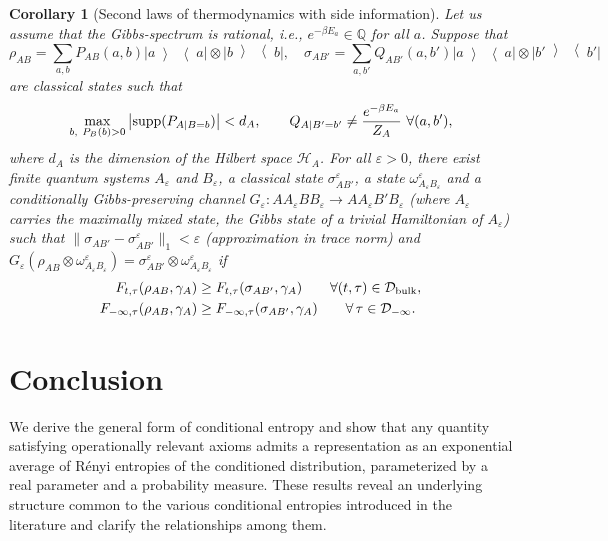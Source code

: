 \documentclass[aps,pra,11pt,onecolumn,nofootinbib,tightenlines]{revtex4-2}
\newtheorem{corollary}[theorem]{Corollary}
\theoremstyle{definition}
\newcommand{\mc}[1]{\mathcal{#1}}
\newcommand{\mb}[1]{\mathbb{#1}}
\newcommand{\ketbra}[2]{\left|#1\middle\rangle\middle\langle #2\right|}
\begin{document}
\begin{corollary}[Second laws of thermodynamics with side information]\label{cor:secondlaws}
Let us assume that the Gibbs-spectrum is rational, i.e., $e^{-\beta E_a}\in\mb Q$ for all $a$. Suppose that
\begin{equation}
\rho_{AB}=\sum_{a,b}P_{AB}(a,b)\ketbra{a}{a}\otimes\ketbra{b}{b},\quad\sigma_{AB'}=\sum_{a,b'}Q_{AB'}(a,b')\ketbra{a}{a}\otimes\ketbra{b'}{b'}
\end{equation}
are classical states such that
\begin{equation}
\max_{b,\ P_B(b)>0}\big|{\rm supp}(P_{A|B=b})\big|<d_A,\qquad Q_{A|B'=b'}\neq\frac{e^{-\beta E_a}}{Z_A}\ \forall(a,b'),
\end{equation}
where $d_A$ is the dimension of the Hilbert space $\mc H_A$. For all $\varepsilon>0$, there exist finite quantum systems $A_\varepsilon$ and $B_\varepsilon$, a classical state $\sigma^\varepsilon_{AB'}$, a state $\omega^\varepsilon_{A_\varepsilon B_\varepsilon}$ and a conditionally Gibbs-preserving channel $G_\varepsilon:AA_\varepsilon BB_\varepsilon\to AA_\varepsilon B'B_\varepsilon$ (where $A_\varepsilon$ carries the maximally mixed state, the Gibbs state of a trivial Hamiltonian of $A_\varepsilon$) such that $\|\sigma_{AB'}-\sigma^\varepsilon_{AB'}\|_1<\varepsilon$ (approximation in trace norm) and $G_\varepsilon(\rho_{AB}\otimes\omega^\varepsilon_{A_\varepsilon B_\varepsilon})=\sigma^\varepsilon_{AB'}\otimes\omega^\varepsilon_{A_\varepsilon B_\varepsilon}$ if
\begin{align}
F_{t,\tau}(\rho_{AB},\gamma_A)&\geq F_{t,\tau}(\sigma_{AB'},\gamma_A)\qquad\forall(t,\tau)\in\mc D_{\rm bulk},\\
F_{-\infty,\tau}(\rho_{AB},\gamma_A)&\geq F_{-\infty,\tau}(\sigma_{AB'},\gamma_A)\qquad\forall\,\tau\in\mc D_{-\infty}.
\end{align}
\end{corollary}

\section{Conclusion}
We derive the general form of conditional entropy and show that any quantity satisfying operationally relevant axioms admits a representation as an exponential average of R\'enyi entropies of the conditioned distribution, parameterized by a real parameter and a probability measure. 
These results reveal an underlying structure common to the various conditional entropies introduced in the literature and clarify the relationships among them.
\end{document}
